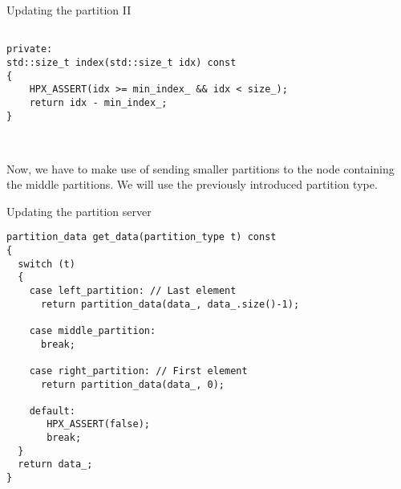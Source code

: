 \documentclass[\classoption]{beamer}
\begin{document}
\begin{frame}[fragile]{Updating the partition II }

\begin{lstlisting}

private:
std::size_t index(std::size_t idx) const
{
	HPX_ASSERT(idx >= min_index_ && idx < size_);
    return idx - min_index_;
}

	
\end{lstlisting}
\vspace{1cm}
Now, we have to make use of sending smaller partitions to the node containing the middle partitions. We will use the previously introduced partition type. 

\end{frame}


\begin{frame}[fragile]{Updating the partition server}

\begin{lstlisting}
partition_data get_data(partition_type t) const
{
  switch (t)
  {
    case left_partition: // Last element
      return partition_data(data_, data_.size()-1);

    case middle_partition:
      break;

    case right_partition: // First element
      return partition_data(data_, 0);

    default:
       HPX_ASSERT(false);
       break;
  }
  return data_;
}

\end{lstlisting}


\end{frame}
\end{document}

